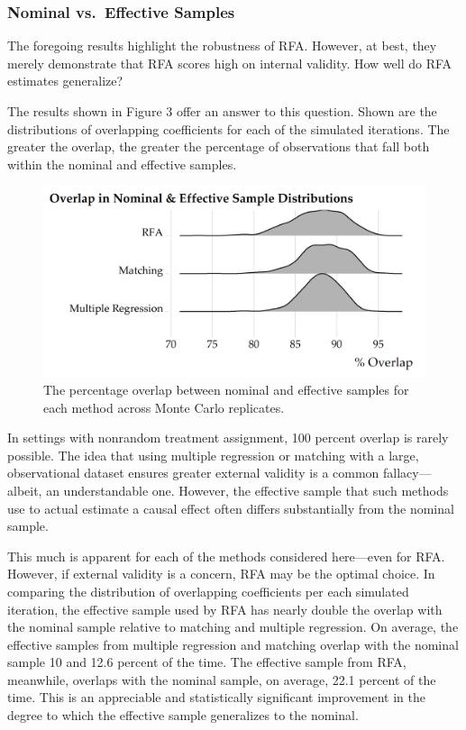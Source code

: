 \documentclass[11pt,]{article}
\begin{document}
\hypertarget{nominal-vs.-effective-samples}{%
\subsubsection{Nominal vs.~Effective
Samples}\label{nominal-vs.-effective-samples}}

The foregoing results highlight the robustness of RFA. However, at best,
they merely demonstrate that RFA scores high on internal validity. How
well do RFA estimates generalize?

The results shown in Figure 3 offer an answer to this question. Shown
are the distributions of overlapping coefficients for each of the
simulated iterations. The greater the overlap, the greater the
percentage of observations that fall both within the nominal and
effective samples.

\begin{figure}
\centering
\includegraphics{overlap_distribution.png}
\caption{The percentage overlap between nominal and effective samples
for each method across Monte Carlo replicates.}
\end{figure}

In settings with nonrandom treatment assignment, 100 percent overlap is
rarely possible. The idea that using multiple regression or matching
with a large, observational dataset ensures greater external validity is
a common fallacy---albeit, an understandable one. However, the effective
sample that such methods use to actual estimate a causal effect often
differs substantially from the nominal sample.

This much is apparent for each of the methods considered here---even for
RFA. However, if external validity is a concern, RFA may be the optimal
choice. In comparing the distribution of overlapping coefficients per
each simulated iteration, the effective sample used by RFA has nearly
double the overlap with the nominal sample relative to matching and
multiple regression. On average, the effective samples from multiple
regression and matching overlap with the nominal sample 10 and 12.6
percent of the time. The effective sample from RFA, meanwhile, overlaps
with the nominal sample, on average, 22.1 percent of the time. This is
an appreciable and statistically significant improvement in the degree
to which the effective sample generalizes to the nominal.
\end{document}
